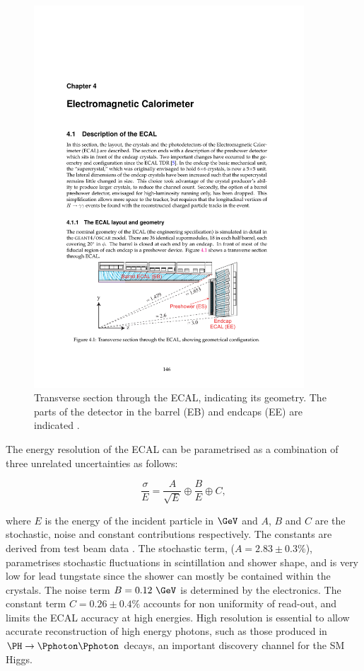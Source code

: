 \begin{figure}[htbp]
   \includegraphics[width=0.9\textwidth]{plots/detector/ecal_layout.pdf}
\caption[Transverse section through the ECAL, indicating its geometry.]
{Transverse section through the \ac{ECAL}, indicating its geometry. The
parts of the detector in the barrel (EB) and endcaps (EE) are indicated
\cite{TDR}.}
\label{fig:ecal}
\end{figure}

The energy resolution of the \ac{ECAL} can be parametrised as a combination of
three unrelated uncertainties as follows:

\begin{equation}
\frac{\sigma}{E} = \frac{A}{\sqrt{E}} \oplus \frac{B}{E} \oplus C , 
\end{equation}

where $E$ is the energy of the incident particle in $\GeV$ and $A$, $B$ and $C$ are the
stochastic, noise and constant contributions respectively. The constants are
derived from test beam data \cite{Chatrchyan:2008aa}. The stochastic term, ($A=2.83\pm0.3\%$),
parametrises stochastic fluctuations in scintillation and shower shape, and is
very low for lead tungstate since the shower can mostly be contained within the
crystals. The noise term $B=0.12~\GeV$ is determined by the electronics. The
constant term $C=0.26\pm0.4\%$ accounts for non uniformity of read-out, 
and limits the \ac{ECAL} accuracy at high energies.
High resolution is essential to allow accurate reconstruction of high energy
photons, such as those produced in $\PH\to\Pphoton\Pphoton$ decays, an important
discovery channel for the \ac{SM} Higgs.

